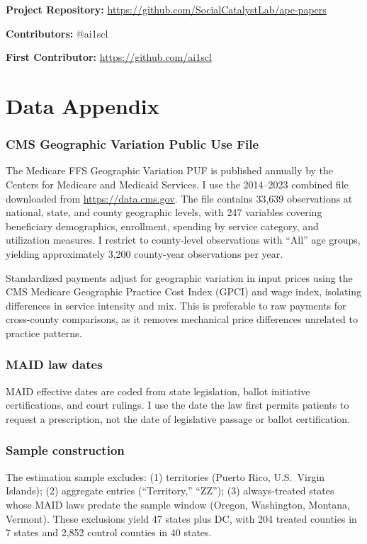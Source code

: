 \documentclass[12pt]{article}
\begin{document}
\noindent\textbf{Project Repository:} \url{https://github.com/SocialCatalystLab/ape-papers}

\noindent\textbf{Contributors:} @ai1scl

\noindent\textbf{First Contributor:} \url{https://github.com/ai1scl}

\label{apep_main_text_end}
\newpage


\newpage
\appendix

\section{Data Appendix}

\subsubsection*{CMS Geographic Variation Public Use File}
The Medicare FFS Geographic Variation PUF is published annually by the Centers for Medicare and Medicaid Services. I use the 2014--2023 combined file downloaded from \url{https://data.cms.gov}. The file contains 33,639 observations at national, state, and county geographic levels, with 247 variables covering beneficiary demographics, enrollment, spending by service category, and utilization measures. I restrict to county-level observations with ``All'' age groups, yielding approximately 3,200 county-year observations per year.

Standardized payments adjust for geographic variation in input prices using the CMS Medicare Geographic Practice Cost Index (GPCI) and wage index, isolating differences in service intensity and mix. This is preferable to raw payments for cross-county comparisons, as it removes mechanical price differences unrelated to practice patterns.

\subsubsection*{MAID law dates}
MAID effective dates are coded from state legislation, ballot initiative certifications, and court rulings. I use the date the law first permits patients to request a prescription, not the date of legislative passage or ballot certification.

\subsubsection*{Sample construction}
The estimation sample excludes: (1) territories (Puerto Rico, U.S.\ Virgin Islands); (2) aggregate entries (``Territory,'' ``ZZ''); (3) always-treated states whose MAID laws predate the sample window (Oregon, Washington, Montana, Vermont). These exclusions yield 47 states plus DC, with 204 treated counties in 7 states and 2,852 control counties in 40 states.
\end{document}
